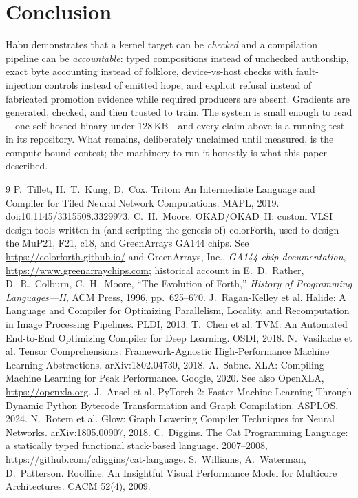 \documentclass[11pt]{article}
\begin{document}
\section{Conclusion}
Habu demonstrates that a kernel target can be \emph{checked} and a
compilation pipeline can be \emph{accountable}: typed compositions
instead of unchecked authorship, exact byte accounting instead of
folklore, device-vs-host checks with fault-injection controls instead of
emitted hope, and explicit refusal instead of fabricated promotion
evidence while required producers are absent. Gradients are generated,
checked, and then trusted to train. The system is small enough to read---one
self-hosted binary under 128\,KB---and every claim above is a running test in
its repository. What remains, deliberately unclaimed until measured, is the
compute-bound contest; the machinery to run it honestly is what this
paper described.

\begin{thebibliography}{9}
 P.~Tillet, H.~T.~Kung, D.~Cox. Triton: An Intermediate
Language and Compiler for Tiled Neural Network Computations. MAPL, 2019.
doi:10.1145/3315508.3329973.
 C.~H.~Moore. OKAD/OKAD~II: custom VLSI design tools
written in (and scripting the genesis of) colorForth, used to design the
MuP21, F21, c18, and GreenArrays GA144 chips.
See \url{https://colorforth.github.io/} and GreenArrays, Inc.,
\emph{GA144 chip documentation}, \url{https://www.greenarraychips.com};
historical account in E.~D.~Rather, D.~R.~Colburn, C.~H.~Moore, ``The
Evolution of Forth,'' \emph{History of Programming Languages---II},
ACM Press, 1996, pp.~625--670.
 J.~Ragan-Kelley et al. Halide: A Language and Compiler
for Optimizing Parallelism, Locality, and Recomputation in Image
Processing Pipelines. PLDI, 2013.
 T.~Chen et al. TVM: An Automated End-to-End Optimizing
Compiler for Deep Learning. OSDI, 2018.
 N.~Vasilache et al. Tensor Comprehensions:
Framework-Agnostic High-Performance Machine Learning Abstractions.
arXiv:1802.04730, 2018.
 A.~Sabne. XLA: Compiling Machine Learning for Peak
Performance. Google, 2020. See also OpenXLA,
\url{https://openxla.org}.
 J.~Ansel et al. PyTorch 2: Faster Machine Learning
Through Dynamic Python Bytecode Transformation and Graph Compilation.
ASPLOS, 2024.
 N.~Rotem et al. Glow: Graph Lowering Compiler Techniques
for Neural Networks. arXiv:1805.00907, 2018.
 C.~Diggins. The Cat Programming Language: a statically
typed functional stack-based language. 2007--2008,
\url{https://github.com/cdiggins/cat-language}.
 S.~Williams, A.~Waterman, D.~Patterson. Roofline: An
Insightful Visual Performance Model for Multicore Architectures.
CACM 52(4), 2009.
\end{thebibliography}
\end{document}
